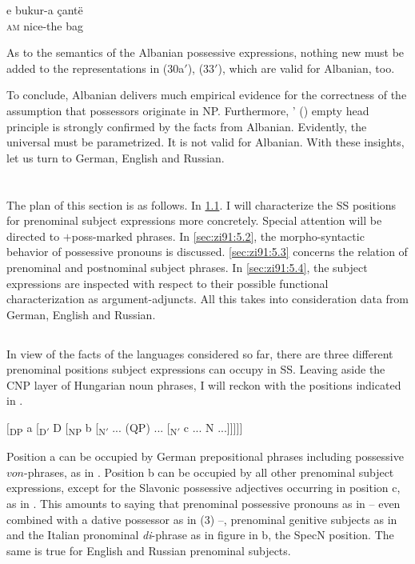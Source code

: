 \documentclass[output=paper,colorlinks,citecolor=brown]{langscibook}
\begin{document}
\ea \label{ex:zi91:51}
    \gll e bukur-a çantë \\
    \textsc{am} nice-the bag \\
    \glt
\z

\noindent As to the semantics of the Albanian possessive expressions, nothing new must be added to the representations in (30a$'$), (33$'$), which are valid for Albanian, too.

To conclude, Albanian delivers much empirical evidence for the correctness of the assumption that possessors originate in NP. Furthermore, \citeauthor{Emonds87Invisible-category}' (\citeyear{Emonds87Invisible-category}) 
empty head principle is strongly confirmed by the facts from Albanian. Evidently, the universal  must be parametrized. It is not valid for Albanian. With these insights, let us turn to German, English and Russian.

\section{} \label{sec:zi91:5}

The plan of this section is as follows. In \ref{sec:zi91:5.1}. I will characterize the SS positions for prenominal subject expressions more concretely. Special attention will be directed to $+$poss-marked phrases. In \ref{sec:zi91:5.2}, the morpho-syntactic behavior of possessive pronouns is discussed. \ref{sec:zi91:5.3} concerns the relation of prenominal and postnominal subject phrases. In \ref{sec:zi91:5.4}, the subject expressions are inspected with respect to their possible functional characterization as argument-adjuncts. All this takes into consideration data from German, English and Russian.

\subsection{} \label{sec:zi91:5.1}

In view of the facts of the languages considered so far, there are three different prenominal positions subject expressions can occupy in SS. Leaving aside the CNP layer of Hungarian noun phrases, I will reckon with the positions indicated in .

\ea \label{ex:zi91:52} $[$\textsubscript{DP} a [\textsubscript{D$'$} D [\textsubscript{NP} b [\textsubscript{N$'$} ... (QP) ... [\textsubscript{N$'$} c ... N ...]]]]]
\z

\noindent Position a can be occupied by German prepositional phrases including possessive $von$-phrases, as in . Position b can be occupied by all other prenominal subject expressions, except for the Slavonic possessive adjectives occurring in position c, as in . This amounts to saying that prenominal possessive pronouns as in  -- even combined with a dative possessor as in (3) --, prenominal genitive subjects as in  and the Italian pronominal \textit{di}-phrase as in  figure in b, the SpecN position. The same is true for English and Russian prenominal subjects.
\end{document}

